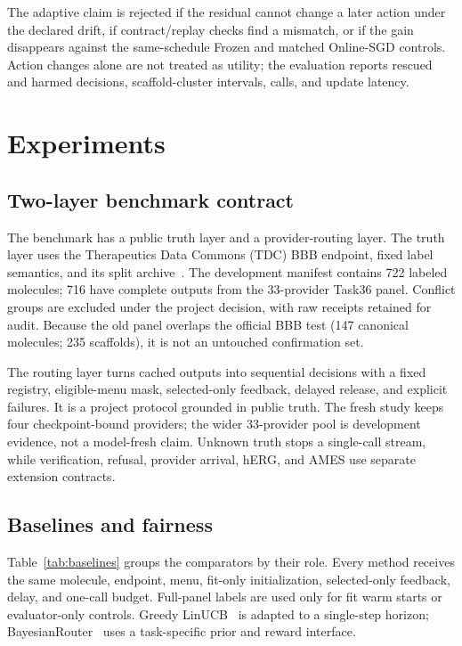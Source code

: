 \documentclass[sigconf,anonymous]{aamas}
\begin{document}
The adaptive claim is rejected if the residual cannot change a later action under the declared drift, if contract/replay checks find a mismatch, or if the gain disappears against the same-schedule Frozen and matched Online-SGD controls. Action changes alone are not treated as utility; the evaluation reports rescued and harmed decisions, scaffold-cluster intervals, calls, and update latency.

\section{Experiments}
\subsection{Two-layer benchmark contract}
The benchmark has a public truth layer and a provider-routing layer. The truth layer uses the Therapeutics Data Commons (TDC) BBB endpoint, fixed label semantics, and its split archive~\cite{huang2021tdc}. The development manifest contains 722 labeled molecules; 716 have complete outputs from the 33-provider Task36 panel. Conflict groups are excluded under the project decision, with raw receipts retained for audit. Because the old panel overlaps the official BBB test (147 canonical molecules; 235 scaffolds), it is not an untouched confirmation set.

The routing layer turns cached outputs into sequential decisions with a fixed registry, eligible-menu mask, selected-only feedback, delayed release, and explicit failures. It is a project protocol grounded in public truth. The fresh study keeps four checkpoint-bound providers; the wider 33-provider pool is development evidence, not a model-fresh claim. Unknown truth stops a single-call stream, while verification, refusal, provider arrival, hERG, and AMES use separate extension contracts.

\subsection{Baselines and fairness}
Table~\ref{tab:baselines} groups the comparators by their role. Every method receives the same molecule, endpoint, menu, fit-only initialization, selected-only feedback, delay, and one-call budget. Full-panel labels are used only for fit warm starts or evaluator-only controls. Greedy LinUCB~\cite{poon2026multillm} is adapted to a single-step horizon; BayesianRouter~\cite{wu2026rewardrouting} uses a task-specific prior and reward interface.
\end{document}
